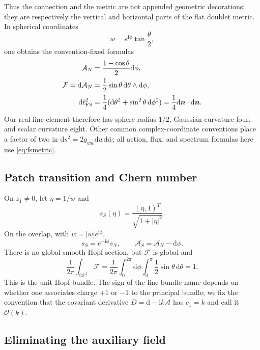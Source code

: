 \documentclass[11pt]{article}
\numberwithin{equation}{section}
\newcommand{\CP}{\mathbb{CP}}
\newcommand{\cO}{\mathcal O}
\newcommand{\dd}{\mathrm d}
\newcommand{\ii}{\mathrm i}
\begin{document}
Thus the connection and the metric are not appended geometric decorations:
they are respectively the vertical and horizontal parts of the flat doublet
metric.  In spherical coordinates
\begin{equation}
 w=e^{\ii\phi}\tan\frac\theta2,
\end{equation}
one obtains the convention-fixed formulas
\begin{align}
 \mathcal A_N&=\frac{1-\cos\theta}{2}\dd\phi,
 \label{eq:AN}\\
 \mathcal F=\dd\mathcal A_N
 &=\frac12\sin\theta\,\dd\theta\wedge\dd\phi,
 \label{eq:curvature}\\
 \dd\ell_{\rm FS}^2
 &=\frac14(\dd\theta^2+\sin^2\theta\,\dd\phi^2)
 =\frac14\dd\bm n\cdot\dd\bm n.
 \label{eq:fssphere}
\end{align}
Our real line element therefore has sphere radius \(1/2\), Gaussian curvature
four, and scalar curvature eight.  Other common complex-coordinate
conventions place a factor of two in \(\dd s^2=2g_{w\bar w}\dd w\dd\bar w\);
all action, flux, and spectrum formulas here use \eqref{eq:fsmetric}.

\subsection{Patch transition and Chern number}

On \(z_1\ne0\), let \(\eta=1/w\) and
\begin{equation}
 s_S(\eta)=\frac{(\eta,1)^T}{\sqrt{1+|\eta|^2}}.
\end{equation}
On the overlap, with \(w=|w|e^{\ii\phi}\),
\begin{equation}
 s_S=e^{-\ii\phi}s_N,
 \qquad
 \mathcal A_S=\mathcal A_N-\dd\phi.
 \label{eq:patchtransition}
\end{equation}
There is no global smooth Hopf section, but \(\mathcal F\) is global and
\begin{equation}
 \frac{1}{2\pi}\int_{\CP^1}\mathcal F
 =\frac{1}{2\pi}\int_0^{2\pi}\dd\phi\int_0^\pi
 \frac12\sin\theta\,\dd\theta=1.
 \label{eq:chernone}
\end{equation}
This is the unit Hopf bundle.  The sign of the line-bundle name depends on
whether one associates charge \(+1\) or \(-1\) to the principal bundle; we fix
the convention that the covariant derivative \(D=\dd-\ii k\mathcal A\) has
\(c_1=k\) and call it \(\cO(k)\).

\subsection{Eliminating the auxiliary field}
\end{document}
